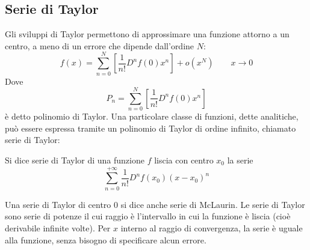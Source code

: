\subsection{Serie di Taylor}
Gli sviluppi di Taylor permettono di approssimare una funzione attorno a un centro, a meno di un errore che dipende dall'ordine $N$:
\[
	f(x)=\sum_{n=0}^N\left[\frac{1}{n!}D^nf(0)x^n\right]+o(x^N)\qquad x\to0
\]
Dove
\[
	P_n=\sum_{n=0}^N\left[\frac{1}{n!}D^nf(0)x^n\right]
\]
è detto polinomio di Taylor. Una particolare classe di funzioni, dette analitiche, può essere espressa tramite un polinomio di Taylor di ordine infinito, chiamato serie di Taylor:
\begin{defin}
	Si dice serie di Taylor di una funzione $f$ liscia con centro $x_0$ la serie
	\begin{equation}
		\sum_{n=0}^{+\infty}\frac{1}{n!}D^nf(x_0)(x-x_0)^n
	\end{equation}
\end{defin}
Una serie di Taylor di centro $0$ si dice anche serie di McLaurin. Le serie di Taylor sono serie di potenze il cui raggio è l'intervallo in cui la funzione è liscia (cioè derivabile infinite volte). Per $x$ interno al raggio di convergenza, la serie è uguale alla funzione, senza bisogno di specificare alcun errore.

